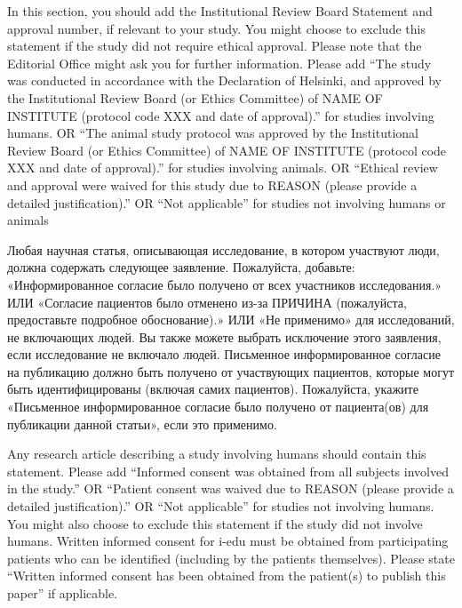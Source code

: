 \documentclass[i-edu.uz,journal,article,submit,pdftex,moreauthors]{Definitions/i-edu.uz}
\begin{document}
\begin{sloppypar}
\institutionalreview

{In this section, you should add the Institutional Review Board Statement and approval number, if relevant to your study. You might choose to exclude this statement if the study did not require ethical approval. Please note that the Editorial Office might ask you for further information. Please add “The study was conducted in accordance with the Declaration of Helsinki, and approved by the Institutional Review Board (or Ethics Committee) of NAME OF INSTITUTE (protocol code XXX and date of approval).” for studies involving humans. OR “The animal study protocol was approved by the Institutional Review Board (or Ethics Committee) of NAME OF INSTITUTE (protocol code XXX and date of approval).” for studies involving animals. OR “Ethical review and approval were waived for this study due to REASON (please provide a detailed justification).” OR “Not applicable” for studies not involving humans or animals}

\informedconsentr

{Любая научная статья, описывающая исследование, в котором участвуют люди, должна содержать следующее заявление. Пожалуйста, добавьте: «Информированное согласие было получено от всех участников исследования.» ИЛИ «Согласие пациентов было отменено из-за ПРИЧИНА (пожалуйста, предоставьте подробное обоснование).» ИЛИ «Не применимо» для исследований, не включающих людей. Вы также можете выбрать исключение этого заявления, если исследование не включало людей. Письменное информированное согласие на публикацию должно быть получено от участвующих пациентов, которые могут быть идентифицированы (включая самих пациентов). Пожалуйста, укажите «Письменное информированное согласие было получено от пациента(ов) для публикации данной статьи», если это применимо.}

\informedconsent

{Any research article describing a study involving humans should contain this statement. Please add ``Informed consent was obtained from all subjects involved in the study.'' OR ``Patient consent was waived due to REASON (please provide a detailed justification).'' OR ``Not applicable'' for studies not involving humans. You might also choose to exclude this statement if the study did not involve humans. 
Written informed consent for i-edu must be obtained from participating patients who can be identified (including by the patients themselves). Please state ``Written informed consent has been obtained from the patient(s) to publish this paper'' if applicable.}


\end{sloppypar}
\end{document}
